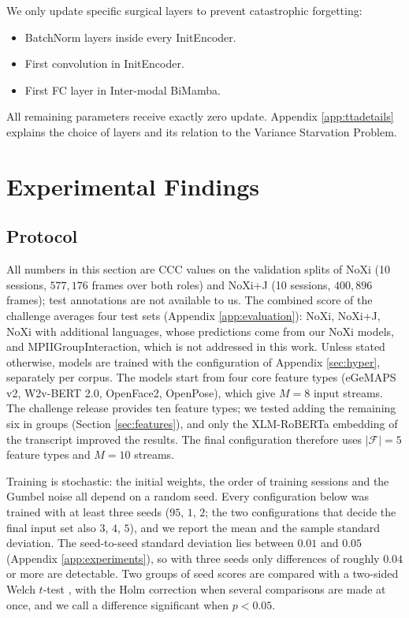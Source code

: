 \documentclass[10pt,a4paper,twocolumn]{article}
\begin{document}
	We only update specific surgical layers to prevent catastrophic forgetting:
	\begin{itemize}
	    \item BatchNorm layers inside every InitEncoder.
	    \item First convolution in InitEncoder.
	    \item First FC layer in Inter-modal BiMamba.
	\end{itemize}
	All remaining parameters receive exactly zero update. Appendix \ref{app:ttadetails} explains the choice of layers and its relation to the Variance Starvation Problem.

	\section{Experimental Findings}
	\label{sec:results}

	\subsection{Protocol}
	\label{sec:protocol}
	All numbers in this section are CCC values on the validation splits of NoXi (10 sessions, $577{,}176$ frames over both roles) and NoXi+J (10 sessions, $400{,}896$ frames); test annotations are not available to us. The combined score of the challenge averages four test sets (Appendix \ref{app:evaluation}): NoXi, NoXi+J, NoXi with additional languages, whose predictions come from our NoXi models, and MPIIGroupInteraction, which is not addressed in this work. Unless stated otherwise, models are trained with the configuration of Appendix \ref{sec:hyper}, separately per corpus. The models start from four core feature types (eGeMAPS v2, W2v-BERT 2.0, OpenFace2, OpenPose), which give $M = 8$ input streams. The challenge release provides ten feature types; we tested adding the remaining six in groups (Section \ref{sec:features}), and only the XLM-RoBERTa embedding of the transcript improved the results. The final configuration therefore uses $|\mathcal{F}| = 5$ feature types and $M = 10$ streams.

	Training is stochastic: the initial weights, the order of training sessions and the Gumbel noise all depend on a random seed. Every configuration below was trained with at least three seeds ($95$, $1$, $2$; the two configurations that decide the final input set also $3$, $4$, $5$), and we report the mean and the sample standard deviation. The seed-to-seed standard deviation lies between $0.01$ and $0.05$ (Appendix \ref{app:experiments}), so with three seeds only differences of roughly $0.04$ or more are detectable. Two groups of seed scores are compared with a two-sided Welch $t$-test \cite{welch1947}, with the Holm correction \cite{holm1979} when several comparisons are made at once, and we call a difference significant when $p < 0.05$.
\end{document}
